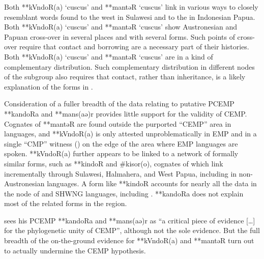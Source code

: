 Both **kVndoR(a) ‘cuscus’
and **mantəR ‘cuscus’ link in various ways to closely resemblant
words found to the west in Sulawesi
and to the  in Indonesian Papua.
Both **kVndoR(a) ‘cuscus’ and **mantəR ‘cuscus’ show Austronesian
and Papuan cross-over in several places
and with several forms.
Such points of cross-over require that contact
and borrowing are a necessary part of their histories.
Both **kVndoR(a) ‘cuscus’ and **mantəR ‘cuscus’ are in a kind of complementary distribution.
Such complementary distribution in different nodes of the 
subgroup also requires that contact,
rather than inheritance, is a likely explanation of the forms in .

Consideration of a fuller breadth of the data relating to putative
PCEMP **kandoRa and **mans(aə)r provides little support for the validity of CEMP.
Cognates of **mantəR are found outside the purported “CEMP” area in 
languages, and **kVndoR(a) is only attested unproblematically in EMP
and in a single “CMP” witness () on the edge of the area
where EMP languages are spoken.
**kVndoR(a) further appears to be linked to a network of formally
similar forms, such as **kindoR and {\#}kisor(o), cognates of which link incrementally
through Sulawesi, Halmahera, and West Papua, including in non-Austronesian languages.
A form like **kindoR accounts for nearly all the data in the
 node of 
and SHWNG languages, including .
**kandoRa does not explain most of the related forms in the region.

\citet[262]{Blust2012b} sees his PCEMP
**kandoRa and **mans(aə)r as “a critical piece of evidence [{\ldots}]
for the phylogenetic unity of CEMP”,
although not the sole evidence.
But the full breadth of the on-the-ground evidence for **kVndoR(a)
and **mantəR turn out to actually undermine the CEMP hypothesis.
